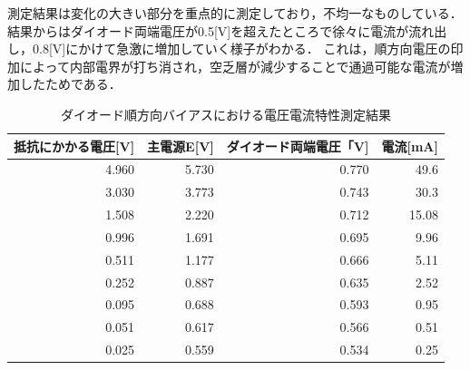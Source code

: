 \documentclass[titlepage]{jarticle}
\begin{document}
測定結果は変化の大きい部分を重点的に測定しており，不均一なものしている．
結果からはダイオード両端電圧が0.5[V]を超えたところで徐々に電流が流れ出し，0.8[V]にかけて急激に増加していく様子がわかる．
これは，順方向電圧の印加によって内部電界が打ち消され，空乏層が減少することで通過可能な電流が増加したためである．
\begin{table}[htbp]
    \caption{ダイオード順方向バイアスにおける電圧電流特性測定結果}
    \begin{center}
        \begin{tabular}{r|r|r|r}
            \hline\hline
            \multicolumn{1}{l|}{抵抗にかかる電圧[V]} & \multicolumn{1}{l|}{主電源E[V]} & \multicolumn{1}{l|}{ダイオード両端電圧「V]} & \multicolumn{1}{l}{電流[mA]} \\ \hline
            4.960                                    & 5.730                           & 0.770                                       & 49.6                         \\ \hline
            3.030                                    & 3.773                           & 0.743                                       & 30.3                         \\ \hline
            1.508                                    & 2.220                           & 0.712                                       & 15.08                        \\ \hline
            0.996                                    & 1.691                           & 0.695                                       & 9.96                         \\ \hline
            0.511                                    & 1.177                           & 0.666                                       & 5.11                         \\ \hline
            0.252                                    & 0.887                           & 0.635                                       & 2.52                         \\ \hline
            0.095                                    & 0.688                           & 0.593                                       & 0.95                         \\ \hline
            0.051                                    & 0.617                           & 0.566                                       & 0.51                         \\ \hline
            0.025                                    & 0.559                           & 0.534                                       & 0.25                         \\ \hline

\end{tabular}
\end{center}
\end{table}
\end{document}
